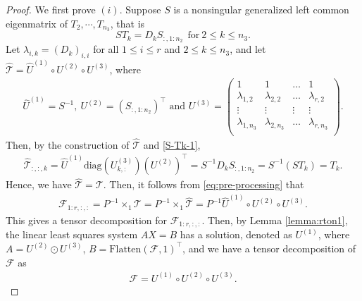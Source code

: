 \documentclass[10pt,a4paper]{amsart}
\renewcommand{\hat}{\widehat}
\begin{document}
\begin{proof}
We first prove $(i)$. Suppose $S$ is a nonsingular generalized left common eigenmatrix of 
$T_2,\cdots,T_{n_3}$, that is 
\begin{equation}\label{S-Tk-1}
    S T_k = D_k S_{:,1:n_2}~~\mathrm{for~} 2\leq k \leq n_3. 
\end{equation}
Let $\lambda_{i,k}=(D_k)_{i,i}$ for all $1\leq i \leq r$ and $2\leq k \leq n_3$, and
let $\hat{\mathcal{T}} = \hat{U}^{(1)} \circ U^{(2)} \circ U^{(3)}$, where
\begin{align}\label{eq:decombyS}
    \hat{U}^{(1)} = S^{-1},~U^{(2)} = (S_{:,1:n_2})^\top \mbox{ and } U^{(3)} = \begin{pmatrix}
        1 & 1 & \dots & 1 \\
        \lambda_{1,2} & \lambda_{2,2} & \dots & \lambda_{r,2} \\
        \vdots  &\vdots  &\vdots  &\vdots  \\
         \lambda_{1,n_3} & \lambda_{2,n_3} & \dots & \lambda_{r,n_3} \\
    \end{pmatrix}.
\end{align}
Then, by the construction of $\hat{\mathcal{T}}$ and \eqref{S-Tk-1}, 
\begin{align*}
\hat{\mathcal{T}}_{:,:,k}=\hat{U}^{(1)}\mathrm{diag}(U^{(3)}_{k,:})(U^{(2)})^\top
=S^{-1}D_{k}S_{:,1:n_2} = S^{-1} (S T_k) =T_k.
\end{align*}
Hence, we have $\hat{\mathcal{T}}=\mathcal{T}$. 
Then, it follows from \eqref{eq:pre-processing} that
\begin{align*}
 \mathcal{F}_{1:r,:,:}=P^{-1}\times_1 \mathcal{T}= P^{-1}\times_1 \hat{\mathcal{T}} =
 P^{-1} \hat{U}^{(1)} \circ U^{(2)} \circ U^{(3)}.
\end{align*}
This gives a tensor decomposition for $\mathcal{F}_{1:r,:,:}$.
Then, by Lemma \ref{lemma:rton1}, the linear least squares system $AX=B$
has a solution, denoted as ${U}^{(1)}$, where $A=U^{(2)} \odot U^{(3)}$, 
$B=\mathrm{Flatten}(\mathcal{F},1)^\top$, and we have a tensor decomposition of 
$\mathcal{F}$ as 
\begin{align} \label{eq:findTDbygceig}
    \mathcal{F}={U}^{(1)} \circ U^{(2)} \circ U^{(3)}.
\end{align}


\end{proof}
\end{document}
